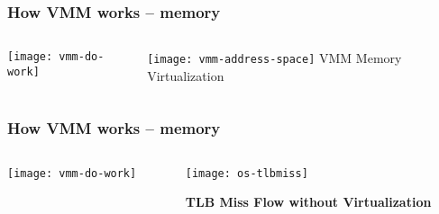 \begin{frame}[plain]
	\frametitle{How VMM works -- memory}
	
	
	
	\begin{columns}
		
		\begin{column}{.25\textwidth}
			
			\texttt{[image: vmm-do-work]}
			
		\end{column}
		
		\begin{column}{.75\textwidth}
			
			
			\centering
			\texttt{[image: vmm-address-space]}	
				VMM Memory Virtualization

			
		\end{column}
		
		
	\end{columns}
	
	
\end{frame}


\begin{frame}[plain]
	\frametitle{How VMM works -- memory}
	
	
	
	\begin{columns}
		
		\begin{column}{.25\textwidth}
			
			\texttt{[image: vmm-do-work]}
			
		\end{column}
		
		\begin{column}{.75\textwidth}
			
			
			\centering
			\texttt{[image: os-tlbmiss]}	
			
			\textbf{TLB Miss Flow without Virtualization}
			
			
			
		\end{column}
		
		
	\end{columns}
	
	
\end{frame}


